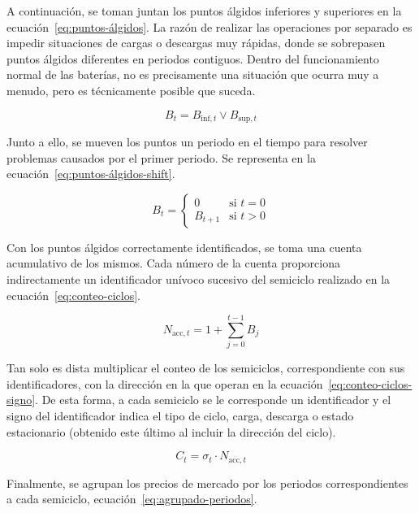A continuación, se toman juntan los puntos álgidos inferiores y superiores en la ecuación~\ref{eq:puntos-álgidos}. La razón de realizar las operaciones por separado es impedir situaciones de cargas o descargas muy rápidas, donde se sobrepasen puntos álgidos diferentes en periodos contiguos. Dentro del funcionamiento normal de las baterías, no es precisamente una situación que ocurra muy a menudo, pero es técnicamente posible que suceda.

\begin{equation}
  \label{eq:puntos-álgidos}
  B_{t} = B_{\text{inf}, t} \lor B_{\text{sup}, t}
\end{equation}

Junto a ello, se mueven los puntos un periodo en el tiempo para resolver problemas causados por el primer periodo. Se representa en la ecuación~\ref{eq:puntos-álgidos-shift}.

\begin{equation}
  \label{eq:puntos-álgidos-shift}
  B_t =
  \begin{cases}
    0       & \text{si } t = 0\\
    B_{t+1} & \text{si } t > 0
  \end{cases}
\end{equation}

Con los puntos álgidos correctamente identificados, se toma una cuenta acumulativo de los mismos. Cada número de la cuenta proporciona indirectamente un identificador unívoco sucesivo del semiciclo realizado en la ecuación~\ref{eq:conteo-ciclos}.

\begin{equation}
  \label{eq:conteo-ciclos}
  N_{\text{acc}, t} = 1 + \sum_{j=0}^{t-1} B_{j}
\end{equation}

Tan solo es dista multiplicar el conteo de los semiciclos, correspondiente con sus identificadores, con la dirección en la que operan en la ecuación~\ref{eq:conteo-ciclos-signo}. De esta forma, a cada semiciclo se le corresponde un identificador y el signo del identificador indica el tipo de ciclo, carga, descarga o estado estacionario (obtenido este último al incluir la dirección del ciclo).

\begin{equation}
  \label{eq:conteo-ciclos-signo}
  C_{t} = \sigma_{t} \cdot N_{\text{acc}, t}
\end{equation}

Finalmente, se agrupan los precios de mercado por los periodos correspondientes a cada semiciclo, ecuación~\ref{eq:agrupado-periodos}.

